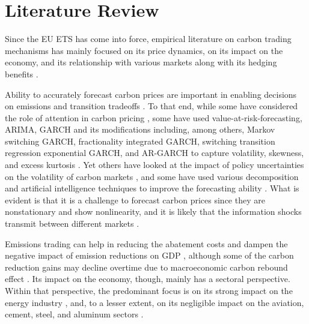 \documentclass[preprint, 3p,
authoryear]{elsarticle} %
\begin{document}
\hypertarget{literature-review}{%
\section{Literature Review}\label{literature-review}}

Since the EU ETS has come into force, empirical literature on carbon
trading mechanisms has mainly focused on its price dynamics, on its
impact on the economy, and its relationship with various markets along
with its hedging benefits
\citep{demiralay_carbon_2022, dai_impact_2022}.

Ability to accurately forecast carbon prices are important in enabling
decisions on emissions and transition tradeoffs
\citep{wang_novel_2021, zhang_forecasting_2024, chen_multiscale_2024}.
To that end, while some have considered the role of attention in carbon
pricing
\citep{zheng_relationship_2022, gong_climate_2023, zhang_forecasting_2024},
some have used value-at-risk-forecasting, ARIMA, GARCH and its
modifications including, among others, Markov switching GARCH,
fractionality integrated GARCH, switching transition regression
exponential GARCH, and AR-GARCH to capture volatility, skewness, and
excess kurtosis
\citep{paolella_econometric_2008, benz_modeling_2009, arouri_nonlinearities_2012, byun_forecasting_2013, garcia-martos_modelling_2013, huang_hybrid_2021}.
Yet others have looked at the impact of policy uncertainties on the
volatility of carbon markets \citep{dai_impact_2022, dong_extreme_2024},
and some have used various decomposition and artificial intelligence
techniques to improve the forecasting ability
\citep{QIN2024131410, wang_novel_2021, chen_multiscale_2024}. What is
evident is that it is a challenge to forecast carbon prices since they
are nonstationary and show nonlinearity, and it is likely that the
information shocks transmit between different markets
\citep{feng_carbon_2011, lutz_nonlinearity_2013, segnon_modeling_2017, chen_multiscale_2024}.

Emissions trading can help in reducing the abatement costs and dampen
the negative impact of emission reductions on GDP
\citep{wu_achieving_2016, lin_impacts_2019}, although some of the carbon
reduction gains may decline overtime due to macroeconomic carbon rebound
effect \citep{bolat_is_2023}. Its impact on the economy, though, mainly
has a sectoral perspective. Within that perspective, the predominant
focus is on its strong impact on the energy industry
\citep{delarue_simulating_2007, kara_impacts_2008, zachmann_first_2008, kirat_impact_2011, bonenti_evaluating_2013, hobbie_windfall_2019, hanif_nonlinear_2021, dai_impact_2022},
and, to a lesser extent, on its negligible impact on the aviation,
cement, steel, and aluminum sectors
\citep{VANASSELT2007497, zhang_overview_2010, oberndorfer_costs_2007, efthymiou_eu_2019}.
\end{document}
